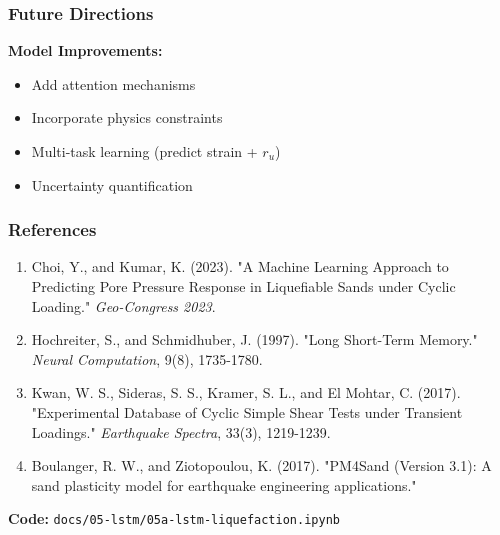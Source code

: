 \documentclass[notes]{beamer}
\begin{document}
\begin{frame}
\frametitle{Future Directions}

\textbf{Model Improvements:}
\begin{itemize}
\item Add attention mechanisms
\item Incorporate physics constraints
\item Multi-task learning (predict strain + $r_u$)
\item Uncertainty quantification
\end{itemize}

\vspace{0.5em}


\end{frame}

\begin{frame}
\frametitle{References}

\footnotesize
\begin{enumerate}
\item Choi, Y., and Kumar, K. (2023). "A Machine Learning Approach to Predicting Pore Pressure Response in Liquefiable Sands under Cyclic Loading." \textit{Geo-Congress 2023}.

\item Hochreiter, S., and Schmidhuber, J. (1997). "Long Short-Term Memory." \textit{Neural Computation}, 9(8), 1735-1780.

\item Kwan, W. S., Sideras, S. S., Kramer, S. L., and El Mohtar, C. (2017). "Experimental Database of Cyclic Simple Shear Tests under Transient Loadings." \textit{Earthquake Spectra}, 33(3), 1219-1239.

\item Boulanger, R. W., and Ziotopoulou, K. (2017). "PM4Sand (Version 3.1): A sand plasticity model for earthquake engineering applications."
\end{enumerate}

\vspace{1em}

\textbf{Code:} \texttt{docs/05-lstm/05a-lstm-liquefaction.ipynb}

\end{frame}

\end{document}
